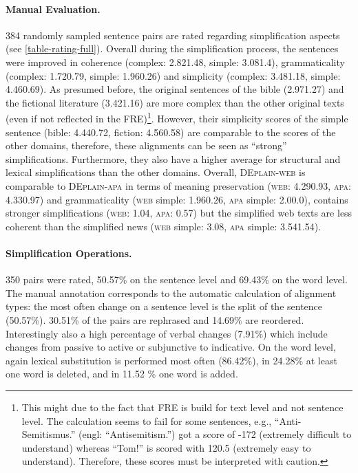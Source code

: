 \documentclass[11pt]{article}
\begin{document}
\paragraph{Manual Evaluation.}
384 randomly sampled sentence pairs  are rated regarding simplification aspects (see \autoref{table-rating-full}). 
Overall during the simplification process, the sentences were improved in coherence (complex: 2.821.48, simple: 3.081.4), grammaticality (complex: 1.720.79, simple: 1.960.26) and simplicity (complex: 3.481.18,  simple: 4.460.69). 
As presumed before, the original sentences of the bible (2.971.27) and the fictional literature (3.421.16) are more complex than the other original texts (even if not reflected in the FRE)\footnote{This might due to the fact that FRE is build for text level and not sentence level. The calculation seems to fail for some sentences, e.g., ``Anti-Semitismus.'' (engl: ``Antisemitism.'') got a score of -172 (extremely difficult to understand) whereas ``Tom!'' is scored with 120.5 (extremely easy to understand). Therefore, these scores must be interpreted with caution.}. However, their simplicity scores of the simple sentence (bible: 4.440.72, fiction: 4.560.58) are comparable to the scores of the other domains, therefore, these alignments can be seen as ``strong'' simplifications.  Furthermore, they also have a higher average for structural and lexical simplifications than the other domains. Overall, \textsc{DEplain-web} is comparable to \textsc{DEplain-apa} in terms of meaning preservation (\textsc{web}: 4.290.93, \textsc{apa}: 4.330.97) and grammaticality (\textsc{web} simple: 1.960.26, \textsc{apa} simple: 2.00.0), contains stronger simplifications (\textsc{web}: 1.04, \textsc{apa}: 0.57) but the simplified web texts are less coherent than the simplified news (\textsc{web} simple: 3.08, \textsc{apa} simple: 3.541.54).




\paragraph{Simplification Operations.}
350 pairs were rated, 50.57\% on the sentence level and 69.43\% on the word level. The manual annotation corresponds to the automatic calculation of alignment types: the most often change on a sentence level is the split of the sentence (50.57\%). 30.51\% of the pairs are rephrased and 14.69\% are reordered. Interestingly also a high percentage of verbal changes (7.91\%) which include changes from passive to active or subjunctive to indicative. On the word level, again lexical substitution is performed most often (86.42\%), in 24.28\% at least one word is deleted, and in 11.52 \% one word is added.
\end{document}
